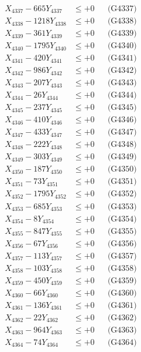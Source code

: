 \documentclass[a4paper,10pt]{article}
\begin{document}
{\begin{align}
X_{4337} - 665Y_{4337} &\leq +0 && \text{(G4337)} \\
X_{4338} - 1218Y_{4338} &\leq +0 && \text{(G4338)} \\
X_{4339} - 361Y_{4339} &\leq +0 && \text{(G4339)} \\
X_{4340} - 1795Y_{4340} &\leq +0 && \text{(G4340)} \\
\allowbreak
X_{4341} - 420Y_{4341} &\leq +0 && \text{(G4341)} \\
X_{4342} - 986Y_{4342} &\leq +0 && \text{(G4342)} \\
X_{4343} - 207Y_{4343} &\leq +0 && \text{(G4343)} \\
X_{4344} - 26Y_{4344} &\leq +0 && \text{(G4344)} \\
X_{4345} - 237Y_{4345} &\leq +0 && \text{(G4345)} \\
X_{4346} - 410Y_{4346} &\leq +0 && \text{(G4346)} \\
X_{4347} - 433Y_{4347} &\leq +0 && \text{(G4347)} \\
X_{4348} - 222Y_{4348} &\leq +0 && \text{(G4348)} \\
X_{4349} - 303Y_{4349} &\leq +0 && \text{(G4349)} \\
X_{4350} - 187Y_{4350} &\leq +0 && \text{(G4350)} \\
\allowbreak
X_{4351} - 73Y_{4351} &\leq +0 && \text{(G4351)} \\
X_{4352} - 1795Y_{4352} &\leq +0 && \text{(G4352)} \\
X_{4353} - 685Y_{4353} &\leq +0 && \text{(G4353)} \\
X_{4354} - 8Y_{4354} &\leq +0 && \text{(G4354)} \\
X_{4355} - 847Y_{4355} &\leq +0 && \text{(G4355)} \\
X_{4356} - 67Y_{4356} &\leq +0 && \text{(G4356)} \\
X_{4357} - 113Y_{4357} &\leq +0 && \text{(G4357)} \\
X_{4358} - 103Y_{4358} &\leq +0 && \text{(G4358)} \\
X_{4359} - 450Y_{4359} &\leq +0 && \text{(G4359)} \\
X_{4360} - 66Y_{4360} &\leq +0 && \text{(G4360)} \\
\allowbreak
X_{4361} - 136Y_{4361} &\leq +0 && \text{(G4361)} \\
X_{4362} - 22Y_{4362} &\leq +0 && \text{(G4362)} \\
X_{4363} - 964Y_{4363} &\leq +0 && \text{(G4363)} \\
X_{4364} - 74Y_{4364} &\leq +0 && \text{(G4364)} \\

\end{align}}
\end{document}
